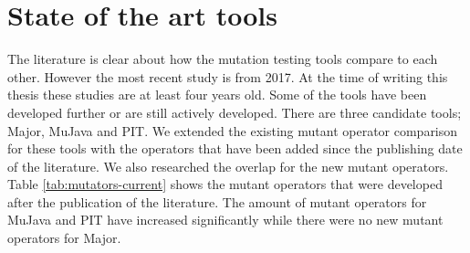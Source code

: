 \documentclass[../main]{subfiles}
\begin{document}
\section{State of the art tools}
The literature is clear about how the mutation testing tools compare to each other.
However the most recent study is from 2017.
At the time of writing this thesis these studies are at least four years old. 
Some of the tools have been developed further or are still actively developed\cite{pit-releases,Major}.
\newline
There are three candidate tools; Major, MuJava and PIT.
We extended the existing mutant operator comparison for these tools with the operators that have been added since the publishing date of the literature.
We also researched the overlap for the new mutant operators.
Table \ref{tab:mutators-current} shows the mutant operators that were developed after the publication of the literature. The amount of mutant operators for  MuJava and PIT have increased significantly while there were no new mutant operators for Major.
\end{document}
